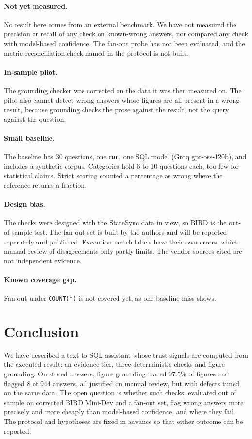 \documentclass[10pt,twocolumn]{article}
\begin{document}
\paragraph{Not yet measured.} No result here comes from an external benchmark. We have not measured the precision or recall of any check on known-wrong answers, nor compared any check with model-based confidence. The fan-out probe has not been evaluated, and the metric-reconciliation check named in the protocol is not built.
\paragraph{In-sample pilot.} The grounding checker was corrected on the data it was then measured on. The pilot also cannot detect wrong answers whose figures are all present in a wrong result, because grounding checks the prose against the result, not the query against the question.
\paragraph{Small baseline.} The baseline has 30 questions, one run, one SQL model (Groq gpt-oss-120b), and includes a synthetic corpus. Categories hold 6 to 10 questions each, too few for statistical claims. Strict scoring counted a percentage as wrong where the reference returns a fraction.
\paragraph{Design bias.} The checks were designed with the StateSync data in view, so BIRD is the out-of-sample test. The fan-out set is built by the authors and will be reported separately and published. Execution-match labels have their own errors, which manual review of disagreements only partly limits. The vendor sources cited are not independent evidence.
\paragraph{Known coverage gap.} Fan-out under \texttt{COUNT(*)} is not covered yet, as one baseline miss shows.

\section{Conclusion}
We have described a text-to-SQL assistant whose trust signals are computed from the executed result: an evidence tier, three deterministic checks and figure grounding. On stored answers, figure grounding traced 97.5\% of figures and flagged 8 of 944 answers, all justified on manual review, but with defects tuned on the same data. The open question is whether such checks, evaluated out of sample on corrected BIRD Mini-Dev and a fan-out set, flag wrong answers more precisely and more cheaply than model-based confidence, and where they fail. The protocol and hypotheses are fixed in advance so that either outcome can be reported.
\end{document}
